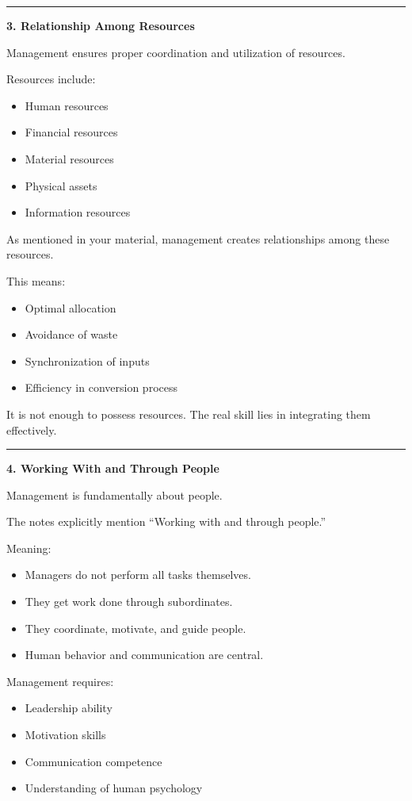 \documentclass[10pt,a4paper]{article}
\newcommand{\separator}{\vspace{0.4em}\noindent\rule{\linewidth}{0.6pt}\vspace{0.4em}}
\begin{document}
\separator

\textbf{3. Relationship Among Resources}

Management ensures proper coordination and utilization of resources.

Resources include:

\begin{itemize}
  \item Human resources
  \item Financial resources
  \item Material resources
  \item Physical assets
  \item Information resources
\end{itemize}

As mentioned in your material, management creates relationships among these resources.

This means:

\begin{itemize}
  \item Optimal allocation
  \item Avoidance of waste
  \item Synchronization of inputs
  \item Efficiency in conversion process
\end{itemize}

It is not enough to possess resources. The real skill lies in integrating them effectively.

\separator

\textbf{4. Working With and Through People}

Management is fundamentally about people.

The notes explicitly mention ``Working with and through people.''

Meaning:

\begin{itemize}
  \item Managers do not perform all tasks themselves.
  \item They get work done through subordinates.
  \item They coordinate, motivate, and guide people.
  \item Human behavior and communication are central.
\end{itemize}

Management requires:

\begin{itemize}
  \item Leadership ability
  \item Motivation skills
  \item Communication competence
  \item Understanding of human psychology
\end{itemize}
\end{document}
